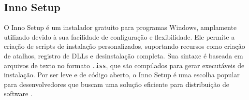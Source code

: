 \subsection{Inno Setup}
O Inno Setup é um instalador gratuito para programas Windows, amplamente utilizado devido à sua facilidade de configuração e flexibilidade. Ele permite a criação de scripts de instalação personalizados, suportando recursos como criação de atalhos, registro de DLLs e desinstalação completa. Sua sintaxe é baseada em arquivos de texto no formato \texttt{.iss}, que são compilados para gerar executáveis de instalação. Por ser leve e de código aberto, o Inno Setup é uma escolha popular para desenvolvedores que buscam uma solução eficiente para distribuição de software \citep{innosetup}.